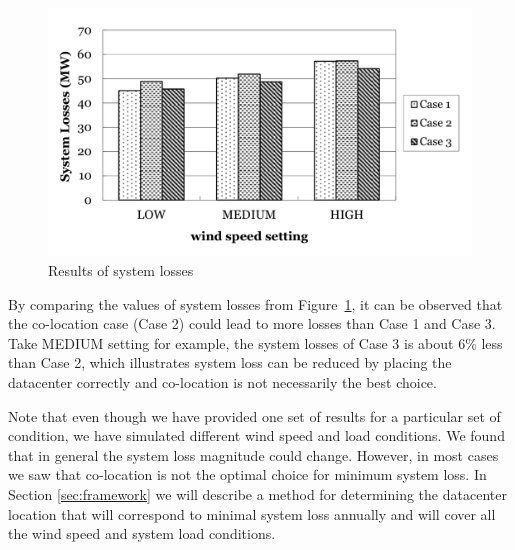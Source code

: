 \begin{figure}[ht]
\centering
\includegraphics[width=1\columnwidth]{img/loss3cases.pdf}
\caption{Results of system losses}
\label{fig:loss-cases}
\end{figure}

By comparing the values of system losses from Figure~\ref{fig:loss-cases}, it can be observed that the co-location case (Case 2) could lead to more losses than Case 1 and Case 3. Take MEDIUM setting for example, the system losses of Case 3 is about 6\% less than Case 2, which illustrates system loss can be reduced by placing the datacenter correctly and co-location is not necessarily the best choice.


Note that even though we have provided one set of results for a particular set of condition, we have simulated different wind speed and load conditions. We found that in general the system loss magnitude could change. However, in most cases we saw that co-location is not the optimal choice for minimum system loss. In Section \ref{sec:framework} we will describe a method for determining the datacenter location that will correspond to minimal system loss annually and will cover all the wind speed and system load conditions.



